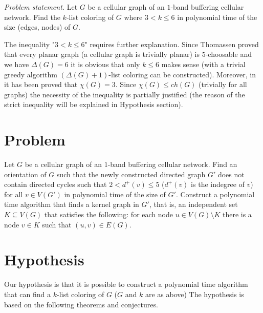 \documentclass[letterpaper, 10 pt, conference]{ieeeconf}  %
\begin{document}
\textit{Problem statement.} Let $G$ be a cellular graph of an $1$-band buffering cellular network. Find the $k$-list coloring of $G$ where $3 < k \leqslant 6$ in polynomial time of the size (edges, nodes) of $G$.

The inequality "$3 < k \leqslant 6$" requires further explanation. Since Thomassen proved that every planar graph (a cellular graph is trivially planar) is $5$-choosable \cite{Thomassen:1994:PG:184180.184192} and we have $\Delta(G)=6$ it is obvious that only $k \leqslant 6$ makes sense (with a trivial greedy algorithm $(\Delta(G)+1)$-list coloring can be constructed). Moreover, in \cite{662943} it has been proved that $\chi(G)=3$. Since $\chi(G) \leqslant ch(G)$ (trivially for all graphs) the necessity of the inequality is partially justified (the reason of the strict inequality will be explained in Hypothesis section).
\section{Problem}


Let $G$ be a cellular graph of an $1$-band buffering cellular network. Find an orientation of $G$ such that the newly constructed directed graph $G'$ does not contain directed cycles such that $2 < d^+(v) \leqslant 5$ ($d^+(v)$ is the indegree of $v$) for all $v \in V(G')$ in polynomial time of the size of $G'$. Construct a polynomial time algorithm that finds a kernel graph in $G'$, that is, an independent set $K \subseteq V(G)$ that satisfies the following: for each node $u \in V(G) \setminus K$ there is a node $v \in K$ such that $(u,v) \in E(G)$.

\section{Hypothesis}

Our hypothesis is that it is possible to construct a polynomial time algorithm that can find a $k$-list coloring of $G$ ($G$ and $k$ are as above) The hypothesis is based on the following theorems and conjectures.
\end{document}
